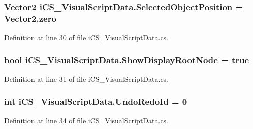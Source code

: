 \hypertarget{classi_c_s___visual_script_data_a9456f565061fbc8ca3b0536fd3d61ff8}{
\subsubsection[{Selected\+Object\+Position}]{\setlength{\rightskip}{0pt plus 5cm}Vector2 i\+C\+S\+\_\+\+Visual\+Script\+Data.\+Selected\+Object\+Position = Vector2.\+zero}}\label{classi_c_s___visual_script_data_a9456f565061fbc8ca3b0536fd3d61ff8}


Definition at line 30 of file i\+C\+S\+\_\+\+Visual\+Script\+Data.\+cs.

\hypertarget{classi_c_s___visual_script_data_a8fd89a2ccaae83d08f3c8a43e8d1bef3}{
\subsubsection[{Show\+Display\+Root\+Node}]{\setlength{\rightskip}{0pt plus 5cm}bool i\+C\+S\+\_\+\+Visual\+Script\+Data.\+Show\+Display\+Root\+Node = true}}\label{classi_c_s___visual_script_data_a8fd89a2ccaae83d08f3c8a43e8d1bef3}


Definition at line 31 of file i\+C\+S\+\_\+\+Visual\+Script\+Data.\+cs.

\hypertarget{classi_c_s___visual_script_data_ac8708ce46b6345280e92f527d736e70d}{
\subsubsection[{Undo\+Redo\+Id}]{\setlength{\rightskip}{0pt plus 5cm}int i\+C\+S\+\_\+\+Visual\+Script\+Data.\+Undo\+Redo\+Id = 0}}\label{classi_c_s___visual_script_data_ac8708ce46b6345280e92f527d736e70d}


Definition at line 34 of file i\+C\+S\+\_\+\+Visual\+Script\+Data.\+cs.

